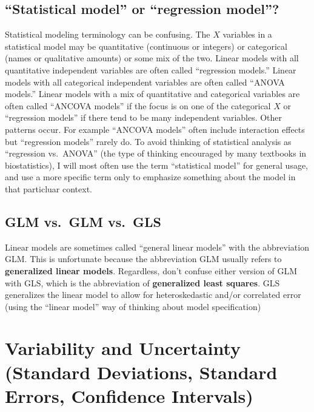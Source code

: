 \documentclass[]{book}
\begin{document}
\section{\texorpdfstring{``Statistical model'' or ``regression
model''?}{Statistical model or regression model?}}\label{statistical-model-or-regression-model}

Statistical modeling terminology can be confusing. The \(X\) variables
in a statistical model may be quantitative (continuous or integers) or
categorical (names or qualitative amounts) or some mix of the two.
Linear models with all quantitative independent variables are often
called ``regression models.'' Linear models with all categorical
independent variables are often called ``ANOVA models.'' Linear models
with a mix of quantitative and categorical variables are often called
``ANCOVA models'' if the focus is on one of the categorical \(X\) or
``regression models'' if there tend to be many independent variables.
Other patterns occur. For example ``ANCOVA models'' often include
interaction effects but ``regression models'' rarely do. To avoid
thinking of statistical analysis as ``regression vs.~ANOVA'' (the type
of thinking encouraged by many textbooks in biostatistics), I will most
often use the term ``statistical model'' for general usage, and use a
more specific term only to emphasize something about the model in that
particluar context.

\section{GLM vs.~GLM vs.~GLS}\label{glm-vs.glm-vs.gls}

Linear models are sometimes called ``general linear models'' with the
abbreviation GLM. This is unfortunate because the abbreviation GLM
usually refers to \textbf{generalized linear models}. Regardless, don't
confuse either version of GLM with GLS, which is the abbreviation of
\textbf{generalized least squares}. GLS generalizes the linear model to
allow for heteroskedastic and/or correlated error (using the ``linear
model'' way of thinking about model specification)

\chapter{Variability and Uncertainty (Standard Deviations, Standard
Errors, Confidence
Intervals)}\label{variability-and-uncertainty-standard-deviations-standard-errors-confidence-intervals}
\end{document}
